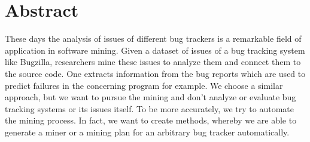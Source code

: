 
\chapter*{Abstract}
\thispagestyle {empty}
These days the analysis of issues of different bug trackers is a remarkable field of application in software mining. Given a dataset of issues of a bug tracking system like Bugzilla, researchers mine these issues to analyze them and connect them to the source code. One extracts information from the bug reports which are used to predict failures in the concerning program for example. We choose a similar approach, but we want to pursue the mining and don't analyze or evaluate bug tracking systems or its issues itself. To be more accurately, we try to automate the mining process. In fact, we want to create methods, whereby we are able to generate a miner or a mining plan for an arbitrary bug tracker automatically.

